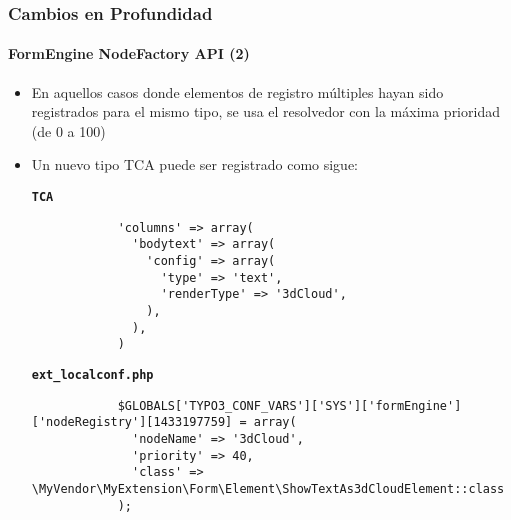 \begin{frame}[fragile]
	\frametitle{Cambios en Profundidad}
	\framesubtitle{FormEngine NodeFactory API (2)}

	\lstset{basicstyle=\tiny\ttfamily}

	\begin{itemize}

		\item En aquellos casos donde elementos de registro múltiples hayan sido registrados para el mismo
			tipo, se usa el resolvedor con la máxima prioridad (de 0 a 100)

		\item Un nuevo tipo TCA puede ser registrado como sigue:

		\smaller\textbf{\texttt{TCA}}
		\begin{lstlisting}
			'columns' => array(
			  'bodytext' => array(
			    'config' => array(
			      'type' => 'text',
			      'renderType' => '3dCloud',
			    ),
			  ),
			)
		\end{lstlisting}

		\smaller\textbf{\texttt{ext\_localconf.php}}
		\begin{lstlisting}
			$GLOBALS['TYPO3_CONF_VARS']['SYS']['formEngine']['nodeRegistry'][1433197759] = array(
			  'nodeName' => '3dCloud',
			  'priority' => 40,
			  'class' => \MyVendor\MyExtension\Form\Element\ShowTextAs3dCloudElement::class
			);
		\end{lstlisting}

	\end{itemize}

\end{frame}


